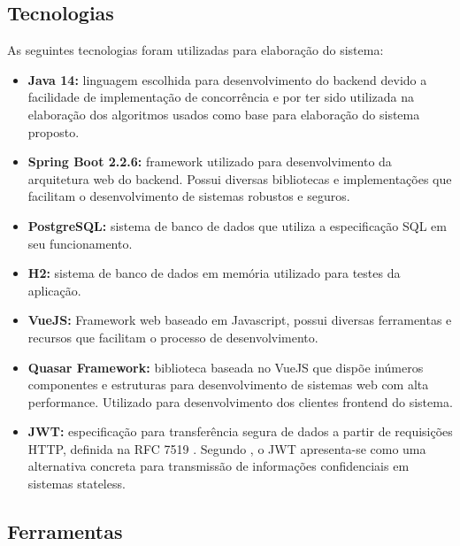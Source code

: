 \subsection{Tecnologias}

As seguintes tecnologias foram utilizadas para elaboração do sistema:

\begin{itemize}
    \item \textbf{Java 14:} linguagem escolhida para desenvolvimento do backend devido a facilidade de implementação de concorrência e por ter sido utilizada na elaboração dos algoritmos usados como base para elaboração do sistema proposto.
    
    \item \textbf{Spring Boot 2.2.6:} framework utilizado para desenvolvimento da arquitetura web do backend. Possui diversas bibliotecas e implementações que facilitam o desenvolvimento de sistemas robustos e seguros.
    
    \item \textbf{PostgreSQL:} sistema de banco de dados que utiliza a especificação SQL em seu funcionamento.
    
    \item \textbf{H2:} sistema de banco de dados em memória utilizado para testes da aplicação.
    
    \item \textbf{VueJS:} Framework web baseado em Javascript, possui diversas ferramentas e recursos que facilitam o processo de desenvolvimento. 
    
    \item \textbf{Quasar Framework:} biblioteca baseada no VueJS que dispõe inúmeros componentes e estruturas para desenvolvimento de sistemas web com alta performance. Utilizado para desenvolvimento dos clientes frontend do sistema.
    
    \item \textbf{JWT:} especificação para transferência segura de dados a partir de requisições HTTP, definida na RFC 7519 \cite{ietftools}. Segundo , o JWT apresenta-se como uma alternativa concreta para transmissão de informações confidenciais em sistemas stateless.
\end{itemize}


\subsection{Ferramentas}

